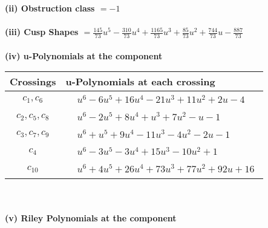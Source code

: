 \documentclass[1p]{elsarticle_modified}
\theoremstyle{definition}
\begin{document}
\flushleft \textbf{(ii) Obstruction class $= -1$}\\~\\
\flushleft \textbf{(iii) Cusp Shapes $= \frac{145}{73} u^5-\frac{310}{73} u^4+\frac{1165}{73} u^3+\frac{85}{73} u^2+\frac{744}{73} u-\frac{887}{73}$}\\~\\
\newpage\renewcommand{\arraystretch}{1}
\flushleft \textbf{(iv) u-Polynomials at the component}\newline \\
\begin{tabular}{m{50pt}|m{274pt}}
Crossings & \hspace{64pt}u-Polynomials at each crossing \\
\hline $$\begin{aligned}c_{1},c_{6}\end{aligned}$$&$\begin{aligned}
&u^6-6 u^5+16 u^4-21 u^3+11 u^2+2 u-4
\end{aligned}$\\
\hline $$\begin{aligned}c_{2},c_{5},c_{8}\end{aligned}$$&$\begin{aligned}
&u^6-2 u^5+8 u^4+u^3+7 u^2- u-1
\end{aligned}$\\
\hline $$\begin{aligned}c_{3},c_{7},c_{9}\end{aligned}$$&$\begin{aligned}
&u^6+u^5+9 u^4-11 u^3-4 u^2-2 u-1
\end{aligned}$\\
\hline $$\begin{aligned}c_{4}\end{aligned}$$&$\begin{aligned}
&u^6-3 u^5-3 u^4+15 u^3-10 u^2+1
\end{aligned}$\\
\hline $$\begin{aligned}c_{10}\end{aligned}$$&$\begin{aligned}
&u^6+4 u^5+26 u^4+73 u^3+77 u^2+92 u+16
\end{aligned}$\\
\hline
\end{tabular}\\~\\
\newpage\renewcommand{\arraystretch}{1}
\flushleft \textbf{(v) Riley Polynomials at the component}\newline \\
\end{document}
